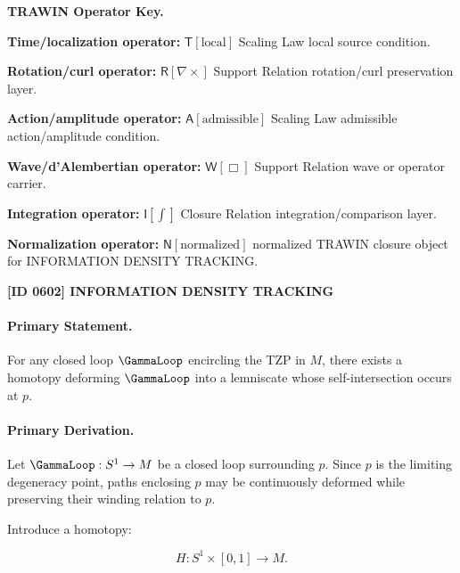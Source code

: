 \par\vspace{0.45\baselineskip}
\noindent\begin{minipage}[t]{\linewidth}
\begingroup
\small
\raggedright
\textbf{TRAWIN Operator Key.}\par
\noindent\textbf{Time/localization operator:} $\mathsf{T}\!\left[\mathrm{local}\right]$ Scaling Law local source condition.\par
\noindent\textbf{Rotation/curl operator:} $\mathsf{R}\!\left[\nabla\times\right]$ Support Relation rotation/curl preservation layer.\par
\noindent\textbf{Action/amplitude operator:} $\mathsf{A}\!\left[\mathrm{admissible}\right]$ Scaling Law admissible action/amplitude condition.\par
\noindent\textbf{Wave/d'Alembertian operator:} $\mathsf{W}\!\left[\Box\right]$ Support Relation wave or operator carrier.\par
\noindent\textbf{Integration operator:} $\mathsf{I}\!\left[\int\right]$ Closure Relation integration/comparison layer.\par
\noindent\textbf{Normalization operator:} $\mathsf{N}\!\left[\mathrm{normalized}\right]$ normalized TRAWIN closure object for INFORMATION DENSITY TRACKING.\par
\endgroup
\end{minipage}

\clearpage
\noindent\textbf{[ID 0602] INFORMATION DENSITY TRACKING}\par
\vspace{0.35em}
\paragraph{Primary Statement.}
For any closed loop $\GammaLoop$ encircling the TZP in $M$, there exists a homotopy deforming $\GammaLoop$ into a lemniscate whose self-intersection occurs at $p$.

\paragraph{Primary Derivation.}
Let $\GammaLoop:S^1\to M$ be a closed loop surrounding $p$. Since $p$ is the limiting degeneracy point, paths enclosing $p$ may be continuously deformed while preserving their winding relation to $p$.

Introduce a homotopy:

\begin{equation}
H:S^1\times[0,1]\to M .
\end{equation}

